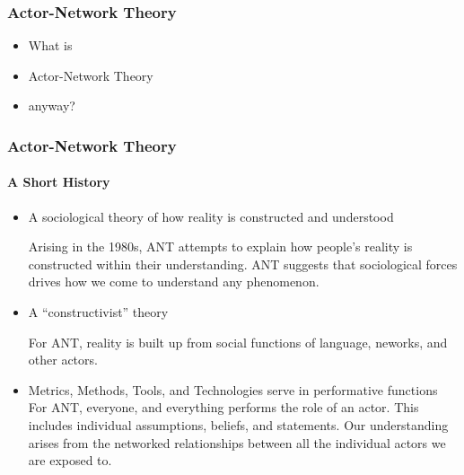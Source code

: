 
\begin{frame}
  \frametitle{Actor-Network Theory}
  \begin{itemize}
          \item What is
          \item \alert{ Actor-Network Theory }
          \item anyway?
  \end{itemize}
\end{frame}


\begin{frame}
  \frametitle{Actor-Network Theory}
  \framesubtitle{A Short History}
  \begin{itemize}
    \item<1-> A sociological theory of how reality is constructed and understood

           {\scriptsize{Arising in the 1980s, ANT attempts to explain how people's reality is constructed within their understanding. }}
           {\scriptsize{ANT suggests that sociological forces drives how we come to understand any phenomenon.}}

    \item<2-> A ``constructivist'' theory

           {\scriptsize{For ANT, reality is built up from social functions of language, neworks, and other actors.}}

    \item<3-> Metrics, Methods, Tools, and Technologies serve in performative functions
           {\scriptsize{For ANT, everyone, and everything performs the role of an actor. This includes individual assumptions, beliefs, and statements. Our understanding arises from the networked relationships between all the individual actors we are exposed to.}}
  \end{itemize}
\end{frame}
